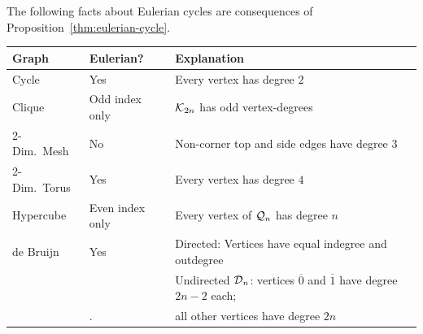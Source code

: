 \begin{corol}
\label{corol:eulerian-named-graphs}
The following facts about Eulerian cycles are consequences of Proposition~\ref{thm:eulerian-cycle}.

{\small
\begin{tabular}{|l|l|l|}
\hline
Graph & Eulerian? & Explanation \\
\hline \hline
Cycle                          & Yes                          & Every vertex has degree $2$ \\
\hline
Clique                         & Odd index only       & $\mbox{$\cal K$}_{2n}$ has odd vertex-degrees \\
\hline
2-Dim.~Mesh  & No                           & Non-corner top and side edges have degree $3$ \\  
\hline                     
2-Dim.~Torus  & Yes                          & Every vertex has degree $4$ \\
\hline
Hypercube                  & Even index only & Every vertex of $\mbox{$\cal Q$}_n$ has degree $n$ \\
\hline
de Bruijn                     & Yes  & Directed: Vertices have equal {\sc indegree} and {\sc outdegree} \\
                                   &         & Undirected $\mbox{$\cal D$}_n$: vertices $\overline{0}$ and $\overline{1}$ have
                                                  degree $2n-2$ each; \\
                                    &.       & \hspace*{.77in}all other vertices have degree $2n$ \\
\hline
\end{tabular}
}
\end{corol}


